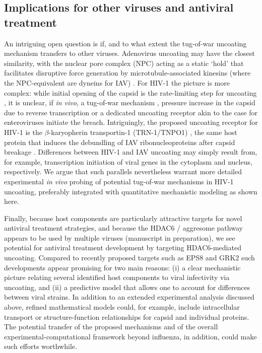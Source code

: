 \subsection{Implications for other viruses and antiviral treatment}

An intriguing open question is if, and to what extent the tug-of-war uncoating mechanism transfers to other viruses. Adenovirus uncoating may have the closest similarity, with the nuclear pore complex (NPC) acting as a static ‘hold’ that facilitates disruptive force generation by microtubule-associated kinesins (where the NPC-equivalent are dyneins for IAV) \cite{flatt2019adenovirus,greber2019adenovirus}. For HIV-1 the picture is more complex: while initial opening of the capsid is the rate-limiting step for uncoating \cite{marquez2018kinetics}, it is unclear, if \textit{in vivo}, a tug-of-war mechanism \cite{rawle2018toward}, pressure increase in the capsid due to reverse transcription \cite{rankovic2017reverse} or a dedicated uncoating receptor akin to the case for enteroviruses \cite{zhao2019human} initiate the breach. Intriguingly, the proposed uncoating receptor for HIV-1 is the $\beta$-karyopherin transportin-1 (TRN-1/TNPO1) \cite{fernandez2019transportin}, the same host protein that induces the debundling of IAV ribonucleoproteins after capsid breakage \cite{miyake2019influenza, yamauchi2020influenza}. Differences between HIV-1 and IAV uncoating may simply result from, for example, transcription initiation of viral genes in the cytoplasm and nucleus, respectively. We argue that such parallels nevertheless warrant more detailed experimental \textit{in vivo} probing of potential tug-of-war mechanisms in HIV-1 uncoating, preferably integrated with quantitative mechanistic modeling as shown here.

Finally, because host components are particularly attractive targets for novel antiviral treatment strategies, and because the HDAC6 / aggresome pathway appears to be used by multiple viruses (manuscript in preparation), we see potential for antiviral treatment development by targeting HDAC6-mediated uncoating. Compared to recently proposed targets such as EPS8 \cite{larson2019eps8} and GRK2 \cite{yanguez2018phosphoproteomic} such developments appear promising for two main reasons: (i) a clear mechanistic picture relating several identified host components to viral infectivity via uncoating, and (ii) a predictive model that allows one to account for differences between viral strains. In addition to an extended experimental analysis discussed above, refined mathematical models could, for example, include intracellular transport or structure-function relationships for capsid and individual proteins. The potential transfer of the proposed mechanisms and of the overall experimental-computational framework beyond influenza, in addition, could make such efforts worthwhile.
